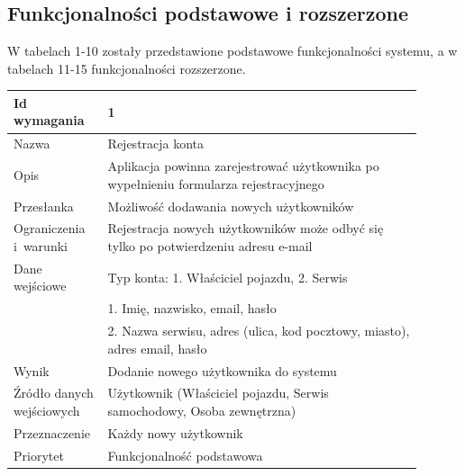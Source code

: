 \documentclass[12pt]{article}
\begin{document}
\subsection{Funkcjonalności podstawowe i rozszerzone}

W tabelach 1-10 zostały przedstawione podstawowe funkcjonalności systemu, a w tabelach 11-15 funkcjonalności rozszerzone.

\begin{table}[H]
\begin{center}
	\begin{tabular}{|p{0.18\linewidth}|p{0.72\linewidth}|}%
	\hline
	Id wymagania 	& 1 				\\ \hline
	Nazwa			& Rejestracja konta \\ \hline
	Opis & Aplikacja powinna zarejestrować użytkownika po wypełnieniu
formularza rejestracyjnego\\ \hline
	Przesłanka & Możliwość dodawania nowych użytkowników  \\ \hline
	Ograniczenia i~warunki & Rejestracja nowych użytkowników może odbyć się tylko po potwierdzeniu adresu e-mail  \\ \hline
	Dane wejściowe & Typ konta: 1. Właściciel pojazdu, 2. Serwis \\
	&  1. Imię, nazwisko, email, hasło \\
	& 2. Nazwa serwisu, adres (ulica, kod pocztowy, miasto), adres email, hasło  \\ \hline
	Wynik & Dodanie nowego użytkownika do systemu \\ \hline
	Źródło danych wejściowych & Użytkownik (Właściciel pojazdu, Serwis samochodowy, Osoba zewnętrzna) \\ \hline
	Przeznaczenie & Każdy nowy użytkownik \\ \hline
	Priorytet & Funkcjonalność podstawowa \\ \hline
	\end{tabular}

\end{center}
\end{table}
\end{document}
